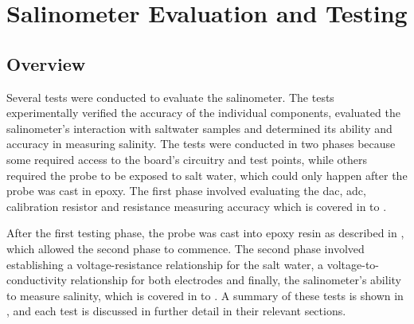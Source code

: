 
\chapter{Salinometer Evaluation and Testing}\label{ch:testing}

\section{Overview}

Several tests were conducted to evaluate the salinometer.
The tests experimentally verified the accuracy of the individual components, evaluated the salinometer's interaction with saltwater samples and determined its ability and accuracy in measuring salinity.
The tests were conducted in two phases because some required access to the board's circuitry and test points, while others required the probe to be exposed to salt water, which could only happen after the probe was cast in epoxy.
The first phase involved evaluating the \gls{dac}, \gls{adc}, calibration resistor and resistance measuring accuracy which is covered in  to .

After the first testing phase, the probe was cast into epoxy resin as described in , which allowed the second phase to commence.
The second phase involved establishing a voltage-resistance relationship for the salt water, a voltage-to-conductivity relationship for both electrodes and finally, the salinometer's ability to measure salinity, which is covered in  to .
A summary of these tests is shown in , and each test is discussed in further detail in their relevant sections.

